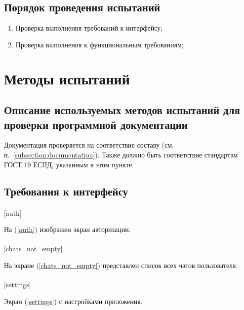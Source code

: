 \documentclass[testmethods]{espd}
\begin{document}
\subsection{Порядок проведения испытаний}
\begin{enumerate}
\item Проверка выполнения требований к интерфейсу;
\item Проверка выполнения к функциональным требованиям;
\end{enumerate}

\section{Методы испытаний}
\subsection{Описание используемых методов испытаний для проверки программной документации}
Документация проверяется на соответствие составу (см. п.~\ref{subsection:documentation}). Также должно быть соответствие стандартам ГОСТ 19 ЕСПД, указанным в этом пункте.

\subsection{Требования к интерфейсу}

\paragraph{} %

[auth]

На (\ref{auth}) изображен экран авторизации.

\paragraph{} %

[chats_not_empty]

На экране (\ref{chats_not_empty}) представлен список всех чатов пользователя.

\paragraph{} %

[settings]

Экран (\ref{settings}) с настройками приложения.
\end{document}
